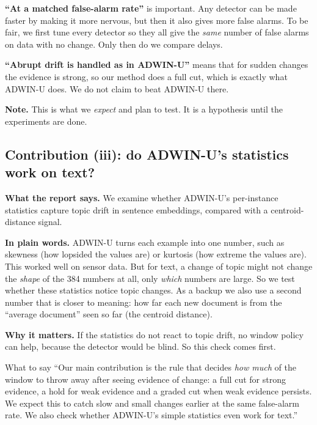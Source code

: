 \documentclass[11pt,a4paper]{article}
\begin{document}
\textbf{``At a matched false-alarm rate''} is important. Any detector can be made faster by making it more nervous, but then it also gives more false alarms. To be fair, we first tune every detector so they all give the \emph{same} number of false alarms on data with no change. Only then do we compare delays.

\textbf{``Abrupt drift is handled as in ADWIN-U''} means that for sudden changes the evidence is strong, so our method does a full cut, which is exactly what ADWIN-U does. We do not claim to beat ADWIN-U there.

\textbf{Note.} This is what we \emph{expect} and plan to test. It is a hypothesis until the experiments are done.

\subsection*{Contribution (iii): do ADWIN-U's statistics work on text?}

\textbf{What the report says.} We examine whether ADWIN-U's per-instance statistics capture topic drift in sentence embeddings, compared with a centroid-distance signal.

\textbf{In plain words.} ADWIN-U turns each example into one number, such as skewness (how lopsided the values are) or kurtosis (how extreme the values are). This worked well on sensor data. But for text, a change of topic might not change the \emph{shape} of the 384 numbers at all, only \emph{which} numbers are large. So we test whether these statistics notice topic changes. As a backup we also use a second number that is closer to meaning: how far each new document is from the ``average document'' seen so far (the centroid distance).

\textbf{Why it matters.} If the statistics do not react to topic drift, no window policy can help, because the detector would be blind. So this check comes first.

\begin{saybox}{What to say}
``Our main contribution is the rule that decides \emph{how much} of the window to throw away after seeing evidence of change: a full cut for strong evidence, a hold for weak evidence and a graded cut when weak evidence persists. We expect this to catch slow and small changes earlier at the same false-alarm rate. We also check whether ADWIN-U's simple statistics even work for text.''
\end{saybox}

\end{document}
